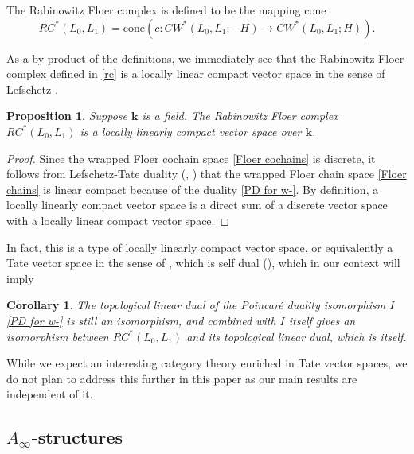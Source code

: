 \documentclass[11pt]{amsproc}
\def\K{{\mathbf{k}}}
\def\ainf{A_\infty}
\def\cone{\mathrm{cone}}
\newtheorem{prop}[lem]{Proposition}
\newtheorem{cor}[lem]{Corollary}
\theoremstyle{remark}
\numberwithin{equation}{section}
\begin{document}
The Rabinowitz Floer complex is defined to be the mapping cone
\begin{equation}\label{rc}
RC^{*}(L_{0}, L_{1}) = \cone(c: CW^{*}(L_{0}, L_{1}; -H) \to CW^{*}(L_{0}, L_{1}; H)).
\end{equation}


As a by product of the definitions, we immediately see that the Rabinowitz Floer complex defined in \eqref{rc} is a locally linear compact vector space in the sense of Lefschetz \cite{lefschetz}.

\begin{prop}\label{prop: rab tate}
Suppose $\K$ is a field. 
The Rabinowitz Floer complex $RC^{*}(L_{0}, L_{1})$ is a locally linearly compact vector space over $\K$.
\end{prop}
\begin{proof}
Since the wrapped Floer cochain space \eqref{Floer cochains} is discrete,
it follows from Lefschetz-Tate duality (\cite[II. (28.2-29.1)]{lefschetz}, \cite[Theorem 1.25]{rojas}) that the wrapped Floer chain space \eqref{Floer chains} is linear compact because of the duality \eqref{PD for w-}.
By definition, a locally linearly compact vector space is a direct sum of a discrete vector space with a locally linear compact vector space.
\end{proof}

In fact, this is a type of locally linearly compact vector space, or equivalently a Tate vector space in the sense of \cite{Beilinson-Feigin-Mazur}, which is self dual (\cite[Proposition 3.15]{CO_tate}),
which in our context will imply

\begin{cor}
The topological linear dual of the Poincar\'{e} duality isomorphism $I$ \eqref{PD for w-} is still an isomorphism, 
and combined with $I$ itself gives an isomorphism between $RC^{*}(L_{0}, L_{1})$ and its topological linear dual,
which is itself.
\end{cor}

While we expect an interesting category theory enriched in Tate vector spaces,
we do not plan to address this further in this paper as our main results are independent of it.

\subsection{$\ainf$-structures}
\end{document}
